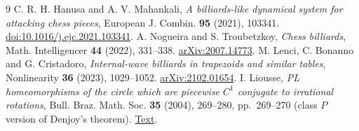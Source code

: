 \documentclass[11pt]{article}
\begin{document}
\small
\begin{thebibliography}{9}
 C. R. H. Hanusa and A. V. Mahankali, \emph{A billiards-like dynamical system for attacking chess pieces}, European J. Combin. \textbf{95} (2021), 103341. \href{https://doi.org/10.1016/j.ejc.2021.103341}{doi:10.1016/j.ejc.2021.103341}.
 A. Nogueira and S. Troubetzkoy, \emph{Chess billiards}, Math. Intelligencer \textbf{44} (2022), 331--338. \href{https://arxiv.org/abs/2007.14773}{arXiv:2007.14773}.
 M. Lenci, C. Bonanno and G. Cristadoro, \emph{Internal-wave billiards in trapezoids and similar tables}, Nonlinearity \textbf{36} (2023), 1029--1052. \href{https://arxiv.org/abs/2102.01654}{arXiv:2102.01654}.
 I. Liousse, \emph{PL homeomorphisms of the circle which are piecewise $C^1$ conjugate to irrational rotations}, Bull. Braz. Math. Soc. \textbf{35} (2004), 269--280, pp.~269--270 (class $P$ version of Denjoy's theorem). \href{https://www.kurims.kyoto-u.ac.jp/EMIS/journals/em/docs/boletim/vol352/v35-2-a7-2004.pdf}{Text}.
\end{thebibliography}
\end{document}
